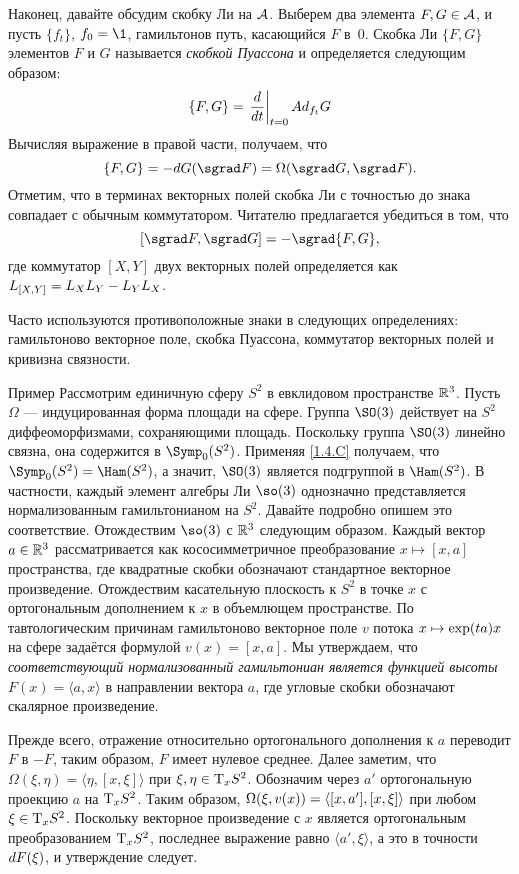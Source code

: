 {Наконец, давайте обсудим скобку Ли на $\mathcal{A}$.
Выберем два элемента $F,G \in \mathcal{A}$, и пусть $\{f_t\}$, $f_0 = \1$, гамильтонов путь, касающийся $F$ в~$0$.
Скобка Ли $\{F, G\}$ элементов $F$ и $G$ называется \emph{скобкой Пуассона} и определяется следующим образом: 
\[\{F, G\}=\left.\frac{d}{d t}\right|_{t=0}Ad_{f_t}G\]
Вычисляя выражение в правой части, получаем, что 
\[\{F, G\} = -\d G (\sgrad F) = \Omega (\sgrad G, \sgrad F).\]
Отметим, что в терминах векторных полей скобка Ли с точностью до знака совпадает с обычным коммутатором.
Читателю предлагается убедиться в том, что 
\[[\sgrad F, \sgrad G] = -\sgrad  \{F, G\},\]
где коммутатор $[X, Y]$ двух векторных полей определяется как $L_{[X, Y]} \z= L_X L_Y -L_Y L_X$.

\begin{framed}
Часто используются противоположные знаки в следующих определениях:
гамильтоново векторное поле,
скобка Пуассона,
коммутатор векторных полей
и кривизна связности.
\end{framed}

\begin{ex}{Пример}\label{1.4.H}
Рассмотрим единичную сферу $S^2$ в евклидовом пространстве $\mathbb{R}^3$.
Пусть $\Omega$ — индуцированная форма площади на сфере.
Группа $\SO(3)$ действует на $S^2$ диффеоморфизмами, сохраняющими площадь.
Поскольку группа $\SO(3)$ линейно связна, она содержится в $\Symp_0 (S^2)$.
Применяя \ref{1.4.C} получаем, что $\Symp_0 (S^2) \z= \Ham (S^2)$, а значит, $\SO (3)$ является подгруппой в $\Ham (S^2)$.
В частности, каждый элемент алгебры Ли $\so(3)$ однозначно представляется нормализованным гамильтонианом на $S^2$.
Давайте подробно опишем это соответствие.
Отождествим $\so (3)$ с $\mathbb{R}^3$ следующим образом.
Каждый вектор $a \in \mathbb{R}^3$ рассматривается как кососимметричное преобразование $x \mapsto [x, a]$ пространства, где квадратные скобки обозначают стандартное векторное произведение.
Отождествим касательную плоскость к $S^2$ в точке $x$ с ортогональным
дополнением к $x$ в объемлющем пространстве.
По тавтологическим причинам гамильтоново векторное поле $v$ потока $x \z\mapsto \exp (ta) x$ на сфере задаётся формулой $v (x) = [x, a]$.
Мы утверждаем, что \textit{соответствующий нормализованный гамильтониан является
функцией высоты $F(x)=\langle a,x\rangle$} в направлении вектора $a$, 
где угловые скобки обозначают скалярное произведение.

Прежде всего, отражение относительно ортогонального дополнения к $a$ переводит $F$ в $-F$, таким образом, $F$ имеет нулевое среднее.
Далее заметим, что $\Omega (\xi, \eta) = \langle\eta, [x, \xi]\rangle$ при $\xi, \eta \in \mathrm{T}_x S^2$.
Обозначим через $a'$ ортогональную проекцию $a$ на $\mathrm{T}_x S^2$.
Таким образом, $\Omega (\xi, v(x)) \z= \langle[x, a'], [x, \xi]\rangle$ при любом $\xi \in \mathrm{T}_x S^2$.
Поскольку векторное произведение с $x$ является ортогональным преобразованием $\mathrm{T}_x S^2$, последнее выражение равно $\langle a', \xi\rangle$,
а это в точности $d F(\xi)$, и утверждение следует.
\end{ex}

}
